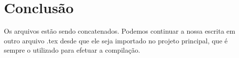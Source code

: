 \chapter{Conclusão}
\label{c.conclusao}

Os arquivos estão sendo concatenados. Podemos continuar a nossa escrita em outro arquivo .tex desde que ele seja importado no projeto principal, que é sempre o utilizado para efetuar a compilação.
